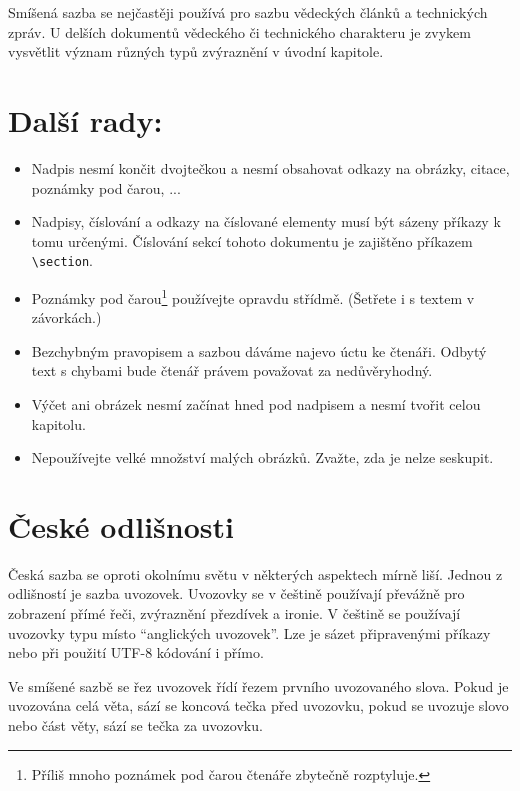 \documentclass [10pt, a4paper, twocolumn] {article}
\begin{document}
Smíšená sazba se nejčastěji používá pro sazbu vědeckých článků a technických zpráv.
U delších dokumentů vědeckého či technického charakteru je zvykem vysvětlit význam různých typů zvýraznění v úvodní kapitole.


\section{Další rady:}

\begin{itemize}
    \item Nadpis nesmí končit dvojtečkou a nesmí obsahovat odkazy na obrázky, citace, poznámky pod čarou, ...
    \item Nadpisy, číslování a odkazy na číslované elementy musí být sázeny příkazy k tomu určenými.
    Číslování sekcí tohoto dokumentu je zajištěno příkazem \verb|\section|.
    \item Poznámky pod čarou\footnote [1]{Příliš mnoho poznámek pod čarou čtenáře zbytečně rozptyluje.} používejte opravdu střídmě.
    (Šetřete i s textem v závorkách.)
    \item Bezchybným pravopisem a sazbou dáváme najevo úctu ke čtenáři.
    Odbytý text s chybami bude čtenář právem považovat za nedůvěryhodný.
    \item Výčet ani obrázek nesmí začínat hned pod nadpisem a nesmí tvořit celou kapitolu.
    \item Nepoužívejte velké množství malých obrázků.
    Zvažte, zda je nelze seskupit.
    
\end{itemize}
  

\section{České odlišnosti}

Česká sazba se oproti okolnímu světu v některých aspektech mírně liší.
Jednou z odlišností je sazba uvozovek.
Uvozovky se v češtině používají převážně pro zobrazení přímé řeči, zvýraznění přezdívek a ironie.
V češtině se používají uvozovky typu  místo \textquotedblleft anglických uvozovek\textquotedblright .
Lze je sázet připravenými příkazy nebo při použití UTF-8 kódování i přímo.

Ve smíšené sazbě se řez uvozovek řídí řezem prvního uvozovaného slova.
Pokud je uvozována celá věta, sází se koncová tečka před uvozovku, pokud se uvozuje slovo nebo část věty, sází se tečka za uvozovku.
\end{document}
